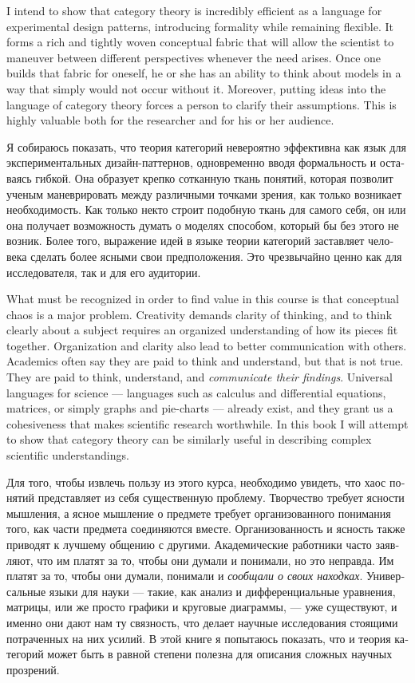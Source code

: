 \documentclass[a4paper]{book}
\theoremstyle{myth}
\begin{document}
\begin{russian}
I intend to show that category theory is incredibly efficient as a language for experimental design patterns, introducing formality while remaining flexible. It forms a rich and tightly woven conceptual fabric that will allow the scientist to maneuver between different perspectives whenever the need arises. Once one builds that fabric for oneself, he or she has an ability to think about models in a way that simply would not occur without it.  Moreover, putting ideas into the language of category theory forces a person to clarify their assumptions. This is highly valuable both for the researcher and for his or her audience.

Я собираюсь показать, что теория категорий невероятно эффективна как язык для экспериментальных дизайн-паттернов,%
 одновременно вводя формальность и оставаясь гибкой. Она образует крепко сотканную ткань понятий, которая позволит ученым маневрировать между различными точками зрения, как только возникает необходимость. Как только некто строит подобную ткань для самого себя, он или она получает возможность думать о моделях способом, который бы без этого не возник. Более того, выражение идей в языке теории категорий заставляет человека сделать более ясными свои предположения. Это чрезвычайно ценно как для исследователя, так и для его аудитории. 

What must be recognized in order to find value in this course is that conceptual chaos is a major problem. Creativity demands clarity of thinking, and to think clearly about a subject requires an organized understanding of how its pieces fit together. Organization and clarity also lead to better communication with others. Academics often say they are paid to think and understand, but that is not true. They are paid to think, understand, and {\em communicate their findings}. Universal languages for science — languages such as calculus and differential equations, matrices, or simply graphs and pie-charts — already exist, and they grant us a cohesiveness that makes scientific research worthwhile. In this book I will attempt to show that category theory can be similarly useful in describing complex scientific understandings.

Для того, чтобы извлечь пользу из этого курса, необходимо увидеть, что хаос понятий представляет из себя существенную проблему. Творчество требует ясности мышления, а ясное мышление о предмете требует организованного понимания того, как части предмета соединяются вместе. Организованность и ясность также приводят к лучшему общению с другими. Академические работники часто заявляют, что им платят за то, чтобы они думали и понимали, но это неправда. Им платят за то, чтобы они думали, понимали и {\em сообщали о своих находках}. Универсальные языки для науки — такие, как анализ и дифференциальные уравнения, матрицы, или же просто графики и круговые диаграммы, — уже существуют, и именно они дают нам ту связность, что делает научные исследования стоящими потраченных на них усилий. В этой книге я попытаюсь показать, что и теория категорий может быть в равной степени полезна для описания сложных научных прозрений. 


\end{russian}
\end{document}
